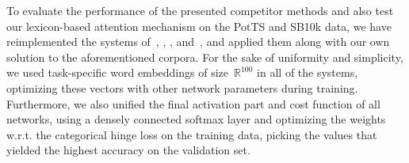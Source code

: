 To evaluate the performance of the presented competitor methods and
also test our lexicon-based attention mechanism on the PotTS and SB10k
data, we have reimplemented the systems of~\citet{Yessenalina:11},
\citet{Socher:11,Socher:12,Socher:13}, \citet{Severyn:15},
and~\citet{Baziotis:17}, and applied them along with our own solution
to the aforementioned corpora.  For the sake of uniformity and
simplicity, we used task-specific word embeddings of
size~$\mathbb{R}^{100}$ in all of the systems, optimizing these
vectors with other network parameters during training.  Furthermore,
we also unified the final activation part and cost function of all
networks, using a densely connected softmax layer and optimizing the
weights w.r.t. the categorical hinge loss on the training data,
picking the values that yielded the highest accuracy on the validation
set.

